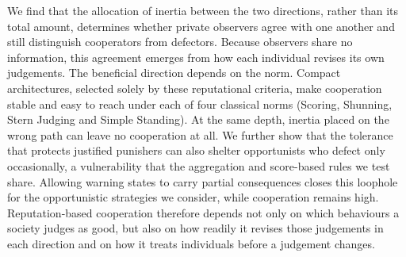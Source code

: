 We find that the allocation of inertia between the two directions, rather than its total amount, determines whether private observers agree with one another and still distinguish cooperators from defectors. Because observers share no information, this agreement emerges from how each individual revises its own judgements. The beneficial direction depends on the norm. Compact architectures, selected solely by these reputational criteria, make cooperation stable and easy to reach under each of four classical norms (Scoring, Shunning, Stern Judging and Simple Standing). At the same depth, inertia placed on the wrong path can leave no cooperation at all. We further show that the tolerance that protects justified punishers can also shelter opportunists who defect only occasionally, a vulnerability that the aggregation and score-based rules we test share. Allowing warning states to carry partial consequences closes this loophole for the opportunistic strategies we consider, while cooperation remains high. Reputation-based cooperation therefore depends not only on which behaviours a society judges as good, but also on how readily it revises those judgements in each direction and on how it treats individuals before a judgement changes.
